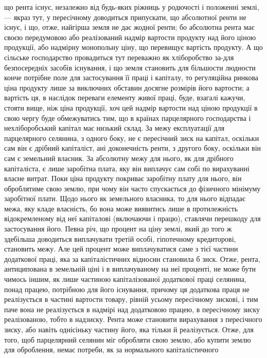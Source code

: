 що рента існує, незалежно від будь-яких ріжниць у родючості і положенні
землі, — якраз тут, у пересічному доводиться припускати, що абсолютної ренти
не існує, і що, отже, найгірша земля не дає жодної ренти; бо абсолютна рента
має своєю передумовою або реалізований надмір вартости продукту над його ціною
продукції, або надмірну монопольну ціну, що перевищує вартість продукту. А що
сільське господарство провадиться тут переважно як хліборобство за-для безпосередніх
засобів існування, і що земля становить для більшости людности
конче потрібне поле для застосування її праці і капіталу, то регуляційна ринкова
ціна продукту лише за виключних обставин досягне розмірів його вартости;
а вартість ця, в наслідок переваги елементу живої праці, буде, взагалі кажучи,
стояти вище, ніж ціна продукції, хоч цей надмір вартости над ціною продукції
в свою чергу буде обмежуватись тим, що в країнах парцелярного господарства
і нехліборобський капітал має низький склад. За межу експлуатації для парцелярного
селянина, з одного боку, не є пересічний зиск на капітал, оскільки
сам він є дрібний капіталіст, ані доконечність ренти, з другого боку, оскільки
він сам є земельний власник. За абсолютну межу для нього, як для дрібного
капіталіста, є лише заробітна плата, яку він виплачує сам собі по вирахуванні
власне витрат. Поки ціна продукту покриває заробітну плату для нього, він
оброблятиме свою землю, при чому він часто спускається до фізичного мінімуму
заробітної плати. Щодо нього як земельного власника, то для нього відпадає
межа, яку кладе власність, бо вона може виявитись лише в протилежність
відокремленому від неї капіталові (включаючи і працю), ставлячи перешкоду для
застосування його. Певна річ, що процент на ціну землі, який до того ж здебільша
доводиться виплачувати третій особі, гіпотечному кредиторові, становить
межу. Але цей процент може виплачуватися саме з тієї частини додаткової
праці, яка за капіталістичних відносин становила б зиск. Отже, рента, антиципована
в земельній ціні і в виплачуваному на неї проценті, не може бути чимось
іншим, як лише частиною капіталізованої додаткової праці селянина, понад
працею, потрібною для його існування, причому ця додаткова праця не реалізується
в частині вартости товару, рівній усьому пересічному зискові, і тим
паче вона не реалізується в надмірі над додатковою працею, в пересічному зиску
реалізованою, тобто в надзиску. Рента може становити вирахування з пересічного
зиску, або навіть однісіньку частину його, яка тільки й реалізується. Отже,
для того, щоб парцелярний селянин міг обробляти свою землю, або купити
землю для оброблення, немає потреби, як за нормального капіталістичного
